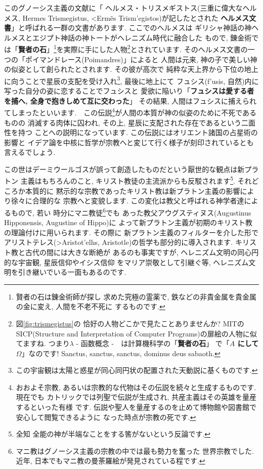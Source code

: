 このグノーシス主義の文献に「 ヘルメス・トリスメギストス(三重に偉大なヘルメス,
 Hermes Trismegistus, \textgreek{<Erm\~es Trism'egistos})が記したとされた
\textbf{ヘルメス文書}」と呼ばれる一群の文書があります. ここでのヘルメスは
ギリシャ神話の神ヘルメスとエジプト神話の神トートがヘレニズム時代に融合した
もので, 錬金術では「\textbf{賢者の石}」\footnote{賢者の石は錬金術師が探し
求めた究極の霊薬で, 鉄などの非貴金属を貴金属の金に変え, 人間を不老不死に
するものです.}を実際に手にした人物\footnote{図\ref{fig:trismegistus}の
恰好の人物どこかで見たことありませんか? MITのSICP(Structure and
 Interpretation of Computer Programs)の扉絵の人物に似てますね.
 つまり$\lambda$ - 函数概念 -　は計算機科学の「\textbf{賢者の石}」
で「\textbf{$A$ にして $\Omega$}」なのです!
Sanctus, sanctus, sanctus, dominus deus sabaoth.}とされています\cite{錬金術}.
そのヘルメス文書の一つの「ポイマンドレース(Poimandres)」\cite{柴田}によると
人間は元来, 神の子で美しい神の似姿として創られたとされます. その彼が高次で
純粋な天上界から下位の地上に向うことで星辰の支配を受け入れ\footnote{この宇宙観は太陽と惑星が同心同円状の配置された天動説に基くものです.}, 最後に地上にて
フュシス(\textgreek{f'usis}, 自然)内に写った自分の姿に恋することでフュシスと
愛欲に陥いり「\textbf{フュシスは愛する者を捕へ, 全身で抱きしめて互に交わった}」
その結果, 人間はフュシスに捕えられてしまったといいます.　この伝説\footnote{
おおよそ宗教, あるいは宗教的な代物はその伝説を続々と生成するものです. 現在でも
カトリックでは列聖で伝説が生成され, 共産主義はその英雄を量産するといった有様
です. 伝説や聖人を量産するのを止めて博物館や図書館で安心して閲覧できるように
なった時点が宗教の死です.}が人間の本質が神の似姿のために不死であるものの
消滅する肉体に囚われ, その上, 星辰に支配された存在であるという二面性を持つ
ことへの説明になっています. この伝説にはオリエント諸国の占星術の影響と
イデア論を中核に哲学が宗教へと変じて行く様子が刻印されているとも言えるでしょう.
\newline

この世はデーミウールゴスが誤って創造したものだという厭世的な観点は新プラトン
主義はもちろんのこと, キリスト教徒の主流派からも反駁されます\footnote{全知
全能の神が半端なことをする筈がないという反論です.}. それどころか本質的に
黙示的な宗教であったキリスト教は新プラトン主義の影響により徐々に合理的な
宗教へと変貌します. この変化は教父と呼ばれる神学者達によるもので, 若い
時分にマニ教徒\footnote{マニ教はグノーシス主義の宗教の中では最も勢力を奮った
世界宗教でした. 近年, 日本でもマニ教の曼荼羅絵が発見されている程です.}でも
あった教父アウグスティヌス(Augustinus Hipponensis, Augustine of Hippo)に
よって新プラトン主義が初期のキリスト教の理論付けに用いられます. その際に
新プラトン主義のフィルターを介した形でアリストテレス(\textgreek{>Aristot'elhs},
Aristotle)の哲学も部分的に導入されます. キリスト教と古代の間には大きな断絶が
あるのも事実ですが, ヘレニズム文明の同心円的な宇宙観, 星辰信仰やイシス信仰
をマリア崇敬として引継ぐ等, ヘレニズム文明を引き継いでいる一面もあるのです.
\newline

